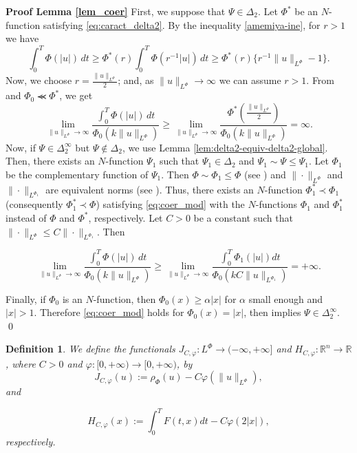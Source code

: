 \documentclass[twoside]{elsarticle}
\newtheorem{defi}[thm]{Definition}
\theoremstyle{remark}
\newcommand{\orlnor}{\|_{L^{\Phi}}}
\newcommand{\lphi}{L^{\Phi}}
\newcommand{\rr}{\mathbb{R}}
\renewcommand{\leq}{\leqslant}
\renewcommand{\geq}{\geqslant}
\begin{document}
\noindent\textbf{Proof Lemma \ref{lem_coer}} First, we suppose that $\Psi \in \Delta_2$.
Let $\Phi^*$ be an $N$-function satisfying \eqref{eq:caract_delta2}.
By the inequality \eqref{amemiya-ine}, for $r>1$ we have
\[
\int_0^T \Phi(|u|)\,dt\geq
\Phi^*(r) \int_0^T \Phi(r^{-1}|u|)\,dt\geq
\Phi^*(r)\{r^{-1}\|u\orlnor-1\}.
\]
Now, we choose $r=\frac{\|u\orlnor}{2}$; and, as $\|u\orlnor\to\infty$ we can assume $r>1$.
From \cite[Thm. 2 (b)(v), p. 16]{rao1991theory} and $\Phi_0\llcurly \Phi^*$,  we get
\begin{equation}\label{eq:caso-delta-2}
\lim\limits_{\|u\orlnor \to \infty} \frac{\int_0^T \Phi(|u|)\,dt}{\Phi_0(k\|u\orlnor)}\geq
\lim\limits_{\|u\orlnor \to \infty} \frac{\Phi^*\left(\frac{\|u\orlnor}{2}\right)}{\Phi_0(k\|u\orlnor)}
=\infty.
\end{equation}
Now, if $\Psi\in\Delta_2^{\infty}$ but $\Psi\notin\Delta_2$, we  use Lemma \ref{lem:delta2-equiv-delta2-global}.
Then, there exists an $N$-function $\Psi_1$ such that $\Psi_1\in\Delta_2$ and  $\Psi_1\sim\Psi\leq \Psi_1$.
Let $\Phi_1$ be the complementary function of $\Psi_1$. Then $\Phi\sim\Phi_1\leq \Phi$ (see \cite[Thm. 3.1]{KR}) and $\|\cdot\orlnor$ and $\|\cdot\|_{L^{\Phi_1}}$ are equivalent norms  (see \cite[Thm. 13.2 and Thm. 13.3]{KR}).
Thus, there exists an $N$-function $\Phi_1^*\prec \Phi_1$ (consequently $\Phi_1^*\prec \Phi$)
satisfying  \eqref{eq:coer_mod}
with the $N$-functions $\Phi_1$ and $\Phi_1^*$ instead of $\Phi$ and $\Phi^*$, respectively.
Let $C>0$ be a constant such that  $\|\cdot\orlnor\leq C\|\cdot\|_{L^{\Phi_1}}$. Then

\[\lim\limits_{\|u\orlnor \to \infty}\frac{\int_0^T \Phi(|u|)\,dt}{\Phi_0(k\|u\orlnor)}\geq \lim\limits_{\|u\orlnor \to \infty} \frac{\int_0^T \Phi_1(|u|)dt}{\Phi_0(kC\|u\|_{L^{\Phi_1}})}=+\infty.\]


Finally, if $\Phi_0$ is an $N$-function, then $\Phi_0(x)\geq \alpha |x|$ for  $\alpha$ small enough and $|x|>1$.
Therefore \eqref{eq:coer_mod} holds for $\Phi_0(x)=|x|$, then \cite[Lemma 5.2]{ABGMS2015}
implies  $\Psi\in\Delta_2^{\infty}$. \qed









\begin{defi}We define the  functionals $J_{C,\varphi}:\lphi\to (-\infty,+\infty]$ and $  H_{C,\varphi}:\rr^n\to \rr$, where $C>0$ and $\varphi:[0,+\infty)\to [0,+\infty)$, by
\begin{equation}\label{func_phi}
  J_{C,\varphi}(u):= \rho_{\Phi}\left(u\right)-C\varphi\left(\|u\orlnor\right),
\end{equation}
 and

\begin{equation}\label{eq:functional_H-bis}
 H_{C,\varphi}(x):=\int_0^TF(t,x)dt-C\varphi(2|x|),
\end{equation}
respectively.
\end{defi}
\end{document}
